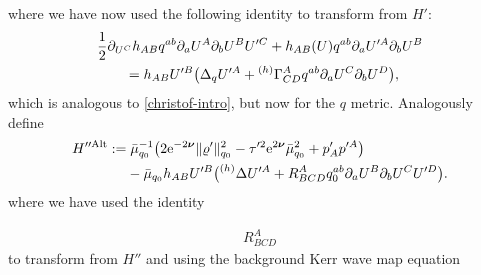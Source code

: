 \documentclass[pdftex]{sigma}
\def\ptl{\partial}%
\def\mbo#1{\boldsymbol{#1}}%
\newcommand{\leftexp}[2]{{\vphantom{#2}}^{#1}{#2}}
\def\halb{\frac{1}{2}}%
\numberwithin{equation}{section}
\begin{document}
where we have now used the following identity to transform from $H'$:
\begin{align*}
&\halb \ptl_{U^C} h_{AB} q^{ab} \ptl_a U^A \ptl_b U^B U'^C + h_{AB}(U) q^{ab} \ptl_a U'^A \ptl_b U^B \notag\\
&\qquad{}= h_{AB} U'^B \bigl(\Delta_q U'^A + \leftexp{(h)}{\Gamma}^A _{CD} q^{ab} \ptl_a U^C \ptl_b U^D\bigr),
\end{align*}
which is analogous to \eqref{christof-intro}, but now for the $q$ metric. %
Analogously define
\begin{align*}
H''^{{\rm Alt}} &:= \bar{\mu}^{-1}_{q_0} \bigl(2 {\rm e}^{-2 \mbo{\nu}} \Vert \varrho' \Vert^2_{q_0} - \tau'^2 {\rm e}^{2 \mbo{\nu}} \bar{\mu}^2_{q_0} + p'_A p'^A\bigr) \notag\\
&\ \quad{}- \bar{\mu}_{q_0} h_{AB} U'^B\bigl(\leftexp{(h)}{\Delta} U'^A +R^A_{BCD} q_0^{ab} \ptl_a U^B \ptl_b U^C U'^D\bigr).
\end{align*}
\iffalse
where we have used the identity

\begin{align}
R^{A}_{BCD}
\end{align}
to transform from $H''$ and using the background Kerr wave map equation
\end{document}
